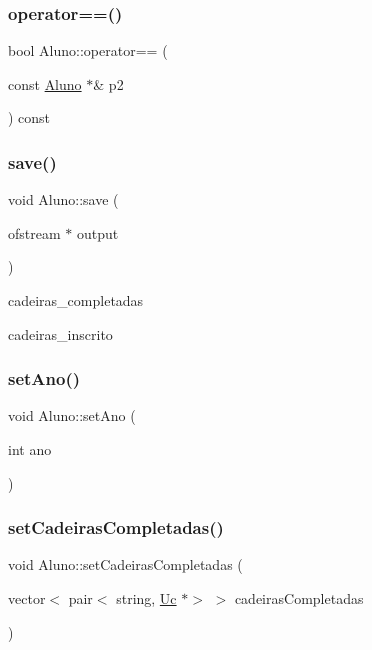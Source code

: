 \hypertarget{class_aluno_a9eeb557159beb7c7c833134ea27f4b56}{}\label{class_aluno_a9eeb557159beb7c7c833134ea27f4b56} 
\subsubsection{\texorpdfstring{operator==()}{operator==()}}
{\footnotesize\ttfamily bool Aluno\+::operator== (\begin{DoxyParamCaption}\item[{const \hyperlink{class_aluno}{Aluno} $\ast$\&}]{p2 }\end{DoxyParamCaption}) const}

\hypertarget{class_aluno_add3489276cc0bccd4f2ac39e3a190979}{}\label{class_aluno_add3489276cc0bccd4f2ac39e3a190979} 
\subsubsection{\texorpdfstring{save()}{save()}}
{\footnotesize\ttfamily void Aluno\+::save (\begin{DoxyParamCaption}\item[{ofstream $\ast$}]{output }\end{DoxyParamCaption})}

cadeiras\+\_\+completadas

cadeiras\+\_\+inscrito \hypertarget{class_aluno_a05e1c531761274c17ecf85a23f75b16a}{}\label{class_aluno_a05e1c531761274c17ecf85a23f75b16a} 
\subsubsection{\texorpdfstring{set\+Ano()}{setAno()}}
{\footnotesize\ttfamily void Aluno\+::set\+Ano (\begin{DoxyParamCaption}\item[{int}]{ano }\end{DoxyParamCaption})}

\hypertarget{class_aluno_aaeb693e1e8888a1034253cb2d4e3fe79}{}\label{class_aluno_aaeb693e1e8888a1034253cb2d4e3fe79} 
\subsubsection{\texorpdfstring{set\+Cadeiras\+Completadas()}{setCadeirasCompletadas()}}
{\footnotesize\ttfamily void Aluno\+::set\+Cadeiras\+Completadas (\begin{DoxyParamCaption}\item[{vector$<$ pair$<$ string, \hyperlink{class_uc}{Uc} $\ast$$>$ $>$}]{cadeiras\+Completadas }\end{DoxyParamCaption})}

